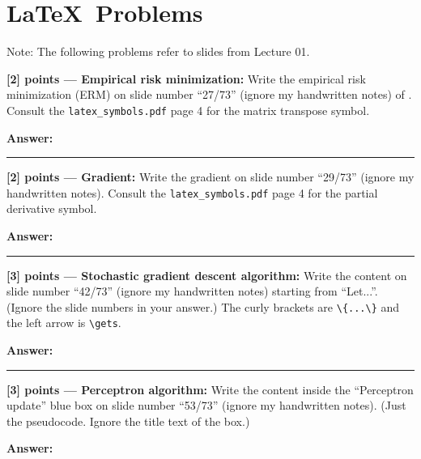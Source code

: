 \documentclass{article}
\newcommand{\mydivider}{\vspace{1em}\hrule\vspace{1em}}
\begin{document}
\section{\LaTeX~Problems}

Note: The following problems refer to slides from Lecture 01.

\vspace{1em}

\noindent\textbf{[2] points --- Empirical risk minimization:} Write the empirical risk minimization (ERM)
on slide number ``27/73''  (ignore my handwritten notes) of . Consult the \verb|latex_symbols.pdf| page 4 for the matrix transpose symbol.

\begin{tcolorbox}
\textbf{Answer: }


\end{tcolorbox}

\mydivider

\noindent\textbf{[2] points --- Gradient:} Write the gradient
on slide number ``29/73''  (ignore my handwritten notes).
Consult the
\verb|latex_symbols.pdf| page 4 for the partial derivative symbol.
\begin{tcolorbox}
\textbf{Answer: }


\end{tcolorbox}

\mydivider


\noindent\textbf{[3] points --- Stochastic gradient descent algorithm:} Write the
content on slide number ``42/73''  (ignore my handwritten notes) starting from ``Let...''. (Ignore the slide numbers in your answer.)
The curly brackets are \verb|\{...\}|
and the left arrow is \verb|\gets|.
\begin{tcolorbox}
\textbf{Answer: }


\end{tcolorbox}


\mydivider


\noindent\textbf{[3] points --- Perceptron algorithm:} Write the
content inside the ``Perceptron update'' blue box on slide number ``53/73''  (ignore my handwritten notes).
(Just the pseudocode. Ignore the title text of the box.)

\begin{tcolorbox}
\textbf{Answer: }


\end{tcolorbox}
\end{document}
